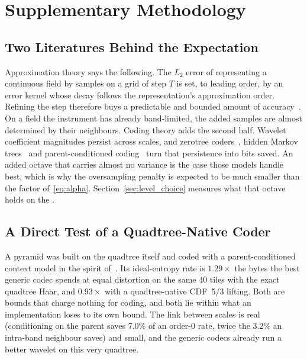 \section{Supplementary Methodology}
\label{app:method}

\subsection{Two Literatures Behind the Expectation}
\label{app:literatures}
Approximation theory says the following. The $L_2$ error of
representing a continuous field by samples on a grid of step $T$ is
set, to leading order, by an error kernel whose decay follows the
representation's approximation order. Refining the step therefore buys
a predictable and bounded amount of
accuracy~\cite{blu1999fourier,blu1999approximation,unser2000sampling}.
On a field the instrument has already band-limited, the added samples
are almost determined by their neighbours. Coding theory adds the
second half. Wavelet coefficient magnitudes persist across scales, and
zerotree coders~\cite{shapiro1993ezw,said1996spiht}, hidden Markov
trees~\cite{crouse1998hmt} and parent-conditioned
coding~\cite{buccigrossi1999joint} turn that persistence into bits
saved. An added octave that carries almost no variance is the case
those models handle best, which is why the oversampling penalty is
expected to be much smaller than the factor of~\eqref{eq:alpha}. Section~\ref{sec:level_choice} measures what that octave holds on the
.

\subsection{A Direct Test of a Quadtree-Native Coder}
\label{app:quadtree}
A pyramid was built on the quadtree itself and coded with a
parent-conditioned context model in the spirit
of~\cite{buccigrossi1999joint}. Its ideal-entropy rate is $1.29\times$
the bytes the best generic codec spends at equal distortion on the same
40 tiles with the exact quadtree Haar, and $0.93\times$ with a
quadtree-native CDF~5/3 lifting.
Both are bounds that charge nothing for coding, and both lie within what
an implementation loses to its own bound. The link between scales is real
(conditioning on the parent saves $7.0\%$ of an order-0 rate, twice the
$3.2\%$ an intra-band neighbour saves) and small, and the generic codecs
already run a better wavelet on this very quadtree.

